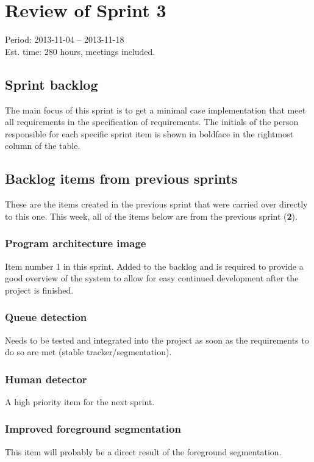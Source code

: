 \section{Review of Sprint 3}
\label{sec:sprint3}
\large Period: 2013-11-04 -- 2013-11-18 \\ 
\large Est. time: 280 hours, meetings included.

\subsection{Sprint backlog}
The main focus of this sprint is to get a minimal case implementation that meet all requirements in the specification of requirements. The initials of the person responsible for each specific sprint item is shown in boldface in the rightmost column of the table.

\subsection{Backlog items from previous sprints}
These are the items created in the previous sprint that were carried over directly to this one. This week, all of the items below are from the previous sprint (\textbf{2}).

\subsubsection{Program architecture image}
Item number 1 in this sprint. Added to the backlog and is required to provide a good overview of the system to allow for easy continued development after the project is finished.

\subsubsection{Queue detection}
Needs to be tested and integrated into the project as soon as the requirements to do so are met (stable tracker/segmentation).

\subsubsection{Human detector}
A high priority item for the next sprint.

\subsubsection{Improved foreground segmentation}
This item will probably be a direct result of the foreground segmentation.

